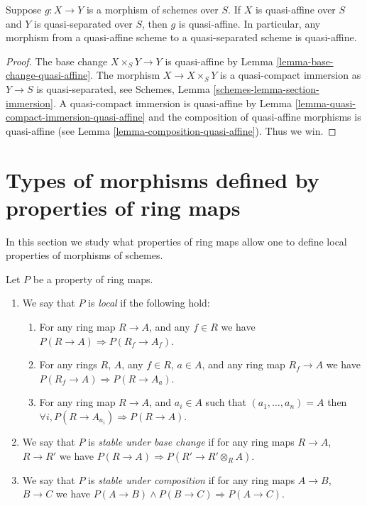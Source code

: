 \begin{lemma}
\label{lemma-quasi-affine-permanence}
Suppose $g : X \to Y$ is a morphism of schemes over $S$.
If $X$ is quasi-affine over $S$ and $Y$ is quasi-separated over $S$,
then $g$ is quasi-affine. In particular, any morphism from a
quasi-affine scheme to a quasi-separated scheme is quasi-affine.
\end{lemma}

\begin{proof}
The base change $X \times_S Y \to Y$ is quasi-affine by
Lemma \ref{lemma-base-change-quasi-affine}.
The morphism $X \to X \times_S Y$ is
a quasi-compact immersion as $Y \to S$ is quasi-separated, see
Schemes, Lemma \ref{schemes-lemma-section-immersion}.
A quasi-compact immersion is quasi-affine by
Lemma \ref{lemma-quasi-compact-immersion-quasi-affine}
and the composition of quasi-affine morphisms is quasi-affine
(see Lemma \ref{lemma-composition-quasi-affine}). Thus we win.
\end{proof}











\section{Types of morphisms defined by properties of ring maps}
\label{section-properties-ring-maps}

\noindent
In this section we study what properties of ring maps
allow one to define local properties of morphisms of schemes.

\begin{definition}
\label{definition-property-local}
Let $P$ be a property of ring maps.
\begin{enumerate}
\item We say that $P$ is {\it local} if the following hold:
\begin{enumerate}
\item For any ring map $R \to A$, and any $f \in R$ we have
$P(R \to A) \Rightarrow P(R_f \to A_f)$.
\item For any rings $R$, $A$, any $f \in R$, $a\in A$, and any ring map
$R_f \to A$ we have $P(R_f \to A) \Rightarrow P(R \to A_a)$.
\item For any ring map $R \to A$, and $a_i \in A$ such that
$(a_1, \ldots, a_n) = A$ then
$\forall i, P(R \to A_{a_i}) \Rightarrow P(R \to A)$.
\end{enumerate}
\item We say that $P$ is {\it stable under base change} if for any
ring maps $R \to A$, $R \to R'$ we have
$P(R \to A) \Rightarrow P(R' \to R' \otimes_R A)$.
\item We say that $P$ is {\it stable under composition} if for any
ring maps $A \to B$, $B \to C$ we have
$P(A \to B) \wedge P(B \to C) \Rightarrow P(A \to C)$.
\end{enumerate}
\end{definition}

